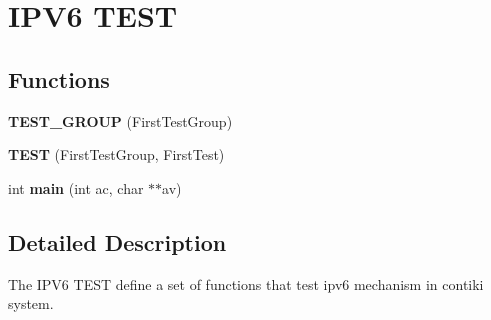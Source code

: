 \hypertarget{group__test__ipv6}{}\section{I\+P\+V6 T\+E\+S\+T}
\label{group__test__ipv6}
\subsection*{Functions}
\begin{DoxyCompactItemize}
\item 
\hypertarget{group__test__ipv6_gaf618d1090f774c8f5c93c8270c83568c}{}{\bfseries T\+E\+S\+T\+\_\+\+G\+R\+O\+U\+P} (First\+Test\+Group)\label{group__test__ipv6_gaf618d1090f774c8f5c93c8270c83568c}

\item 
\hypertarget{group__test__ipv6_ga9512013044d733bc8c7bd912dc5cba49}{}{\bfseries T\+E\+S\+T} (First\+Test\+Group, First\+Test)\label{group__test__ipv6_ga9512013044d733bc8c7bd912dc5cba49}

\item 
\hypertarget{group__test__ipv6_ga0c99d968a34e803d378692bde2e3f18f}{}int {\bfseries main} (int ac, char $\ast$$\ast$av)\label{group__test__ipv6_ga0c99d968a34e803d378692bde2e3f18f}

\end{DoxyCompactItemize}


\subsection{Detailed Description}
The I\+P\+V6 T\+E\+S\+T define a set of functions that test ipv6 mechanism in contiki system. 